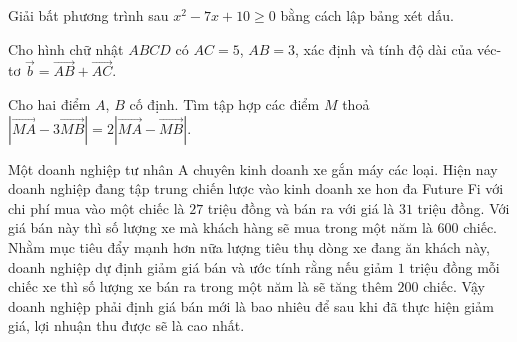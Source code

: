 \begin{ex}[0,5 điểm]%
Giải bất phương trình sau $x^2-7x+10\ge 0$ bằng cách lập bảng xét dấu.
\loigiai{
Tam thức bậc hai $f(x)=x^2-7x+10$ có $a=1>0$ và có hai nghiệm $x_1=2$, $x_2=5$. \\
Suy ra $x^2-7x+10\ge 0\Leftrightarrow \hoac{&x\le 2\\&x\ge 5.}$ \\
Vậy tập nghiệm của bất phương trình là $S=(-\infty;2]\cup [5;+\infty)$.
}
\end{ex}

\begin{ex}[0,5 điểm]%
Cho hình chữ nhật $ABCD$ có $AC=5$, $AB=3$, xác định và tính độ dài của véc-tơ $\overrightarrow{b}=\overrightarrow{AB}+\overrightarrow{AC}$.
\end{ex}

\begin{ex}[0,5 điểm]
Cho hai điểm $A$, $B$ cố định. Tìm tập hợp các điểm $M$ thoả $|\vec{MA}-3\vec{MB}|=2|\vec{MA}-\vec{MB}|$.
\end{ex}

\begin{ex}%
    Một doanh nghiệp tư nhân A chuyên kinh doanh xe gắn máy các loại. Hiện nay doanh nghiệp đang tập trung chiến lược vào kinh doanh xe hon đa Future Fi với chi phí mua vào một chiếc là $27$ triệu đồng và bán ra với giá là $31$ triệu đồng. Với giá bán này thì số lượng xe mà khách hàng sẽ mua trong một năm là $600$ chiếc. Nhằm mục tiêu đẩy mạnh hơn nữa lượng tiêu thụ dòng xe đang ăn khách này, doanh nghiệp dự định giảm giá bán và ước tính rằng nếu giảm $1$ triệu đồng mỗi chiếc xe thì số lượng xe bán ra trong một năm là sẽ tăng thêm $200$ chiếc. Vậy doanh nghiệp phải định giá bán mới là bao nhiêu để sau khi đã thực hiện giảm giá, lợi nhuận thu được sẽ là cao nhất.
    \loigiai{
    }
\end{ex}